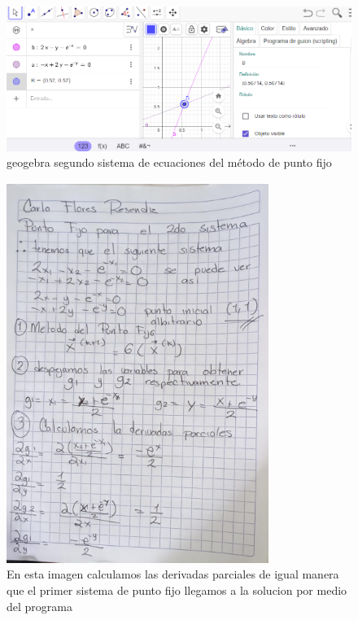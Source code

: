 \documentclass{article}
\begin{document}
\begin{figure}
        \centering
        \includegraphics[width=1.5\linewidth]{punto fijo 2do sistema.PNG}
        \caption{geogebra segundo sistema de ecuaciones del método de punto fijo }
        \label{fig:enter-label}
    \end{figure}


\begin{figure}
        \centering
        \includegraphics[width=1\linewidth]{derivadas parciales 2do sistema.PNG}
        \caption{En esta imagen calculamos las derivadas parciales de igual manera que el primer sistema de punto fijo llegamos a la solucion por medio del programa  }
        \label{fig:enter-label}
    \end{figure}
\end{document}
